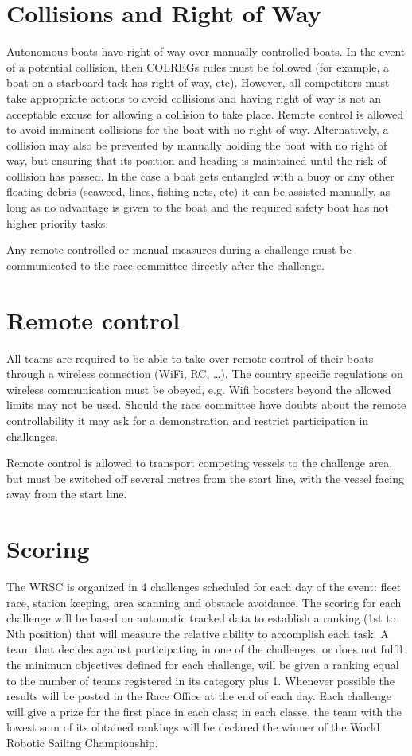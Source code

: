 \documentclass[12pt]{article}
\begin{document}
\section{Collisions and Right of Way}
Autonomous boats have right of way over manually controlled boats. In the event
of a potential
collision, then COLREGs rules must be followed (for example, a boat on a
starboard tack has
right of way, etc). However, all competitors must take appropriate actions to
avoid collisions
and having right of way is not an acceptable excuse for allowing a collision to
take place.
Remote control is allowed to avoid imminent collisions for the boat with no 
right of way. Alternatively, a collision may also be
prevented by manually holding the boat with no right of way, but ensuring that 
its position and heading is maintained until the risk of collision has passed. 
In the case a boat gets entangled with a buoy or any other
floating debris (seaweed, lines, fishing nets, etc) it can be assisted manually,
as long as no advantage is given to the boat and the required safety boat has
not higher priority tasks.

Any remote controlled or manual measures during a challenge must be
communicated to the race committee directly after the challenge.

\section{Remote control}
All teams are required to be able to take over remote-control of their boats
through a wireless connection (WiFi, RC, \ldots). The country specific 
regulations on wireless communication must be obeyed, e.g. Wifi boosters beyond
the allowed limits may not be used.
Should the race committee have doubts about the remote controllability it may
ask for a demonstration and restrict participation in challenges.

Remote control is allowed to transport competing vessels to the challenge area,
but must be switched off several metres from the start line, with the vessel
facing away from the start line.


\section{Scoring}
The WRSC is organized in 4 challenges scheduled for each day of the event: fleet
race, station keeping, area scanning and obstacle avoidance. The scoring for each 
challenge will be based on automatic tracked data to establish a ranking 
(1st to Nth position) that will measure the relative
ability to accomplish each task. A team that decides against participating in
one of the challenges, or does not fulfil the minimum objectives defined for
each challenge, will be given a ranking equal to the number of teams registered 
in its category plus 1. Whenever possible
the results will be posted in the Race Office at the end of each day.
Each challenge will give a prize for the first place in each class; in each classe, 
the team with the lowest sum of its obtained rankings will be declared the
winner of the World Robotic Sailing Championship.
\end{document}
